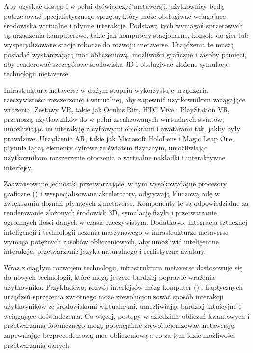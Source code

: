 Aby uzyskać dostęp i w pełni doświadczyć metawersji, użytkownicy będą potrzebować specjalistycznego sprzętu, który może obsługiwać wciągające środowiska wirtualne i płynne interakcje. Podstawą tych wymagań sprzętowych są urządzenia komputerowe, takie jak komputery stacjonarne, konsole do gier lub wyspecjalizowane stacje robocze do rozwoju metaverse. Urządzenia te muszą posiadać wystarczającą moc obliczeniową, możliwości graficzne i zasoby pamięci, aby renderować szczegółowe środowiska 3D i obsługiwać złożone symulacje technologii metaverse\cite{metaverseInfrastructureIEEE}.

Infrastruktura metaverse w dużym stopniu wykorzystuje urządzenia rzeczywistości rozszerzonej i wirtualnej, aby zapewnić użytkownikom wciągające wrażenia. Zestawy VR, takie jak Oculus Rift, HTC Vive i PlayStation VR, przenoszą użytkowników do w pełni zrealizowanych wirtualnych światów, umożliwiając im interakcję z cyfrowymi obiektami i awatarami tak, jakby były prawdziwe. Urządzenia AR, takie jak Microsoft HoloLens i Magic Leap One, płynnie łączą elementy cyfrowe ze światem fizycznym, umożliwiając użytkownikom rozszerzenie otoczenia o wirtualne nakładki i interaktywne interfejsy\cite{metaverseInfrastructureIEEE}.

Zaawansowane jednostki przetwarzające, w tym wysokowydajne procesory graficzne  () i wyspecjalizowane akceleratory, odgrywają kluczową rolę w zwiększaniu doznań płynących z metaverse. Komponenty te są odpowiedzialne za renderowanie złożonych środowisk 3D, symulację fizyki i przetwarzanie ogromnych ilości danych w czasie rzeczywistym. Dodatkowo, integracja sztucznej inteligencji i technologii uczenia maszynowego w infrastrukturze metaverse wymaga potężnych zasobów obliczeniowych, aby umożliwić inteligentne interakcje, przetwarzanie języka naturalnego i realistyczne awatary\cite{metaverseInfrastructureIEEE}.

Wraz z ciągłym rozwojem technologii, infrastruktura metaverse dostosowuje się do nowych technologii, które mogą jeszcze bardziej poprawić wrażenia użytkownika. Przykładowo, rozwój interfejsów mózg-komputer  () i haptycznych urządzeń sprzężenia zwrotnego może zrewolucjonizować sposób interakcji użytkowników ze środowiskami wirtualnymi, umożliwiając bardziej intuicyjne i wciągające doświadczenia. Co więcej, postępy w dziedzinie obliczeń kwantowych i przetwarzania fotonicznego mogą potencjalnie zrewolucjonizować metawersję, zapewniając bezprecedensową moc obliczeniową a co za tym idzie możliwości przetwarzania danych\cite{metaverseInfrastructureIEEE}.

